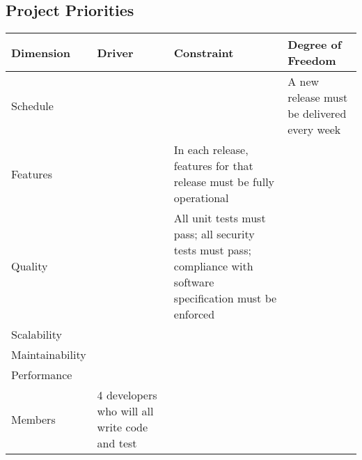 \documentclass[letter]{scrartcl}
\begin{document}
\subsection{Project Priorities}
\begin{tabularx}{\textwidth}{| X | X | X | X |}
\hline
\textbf{Dimension} & \textbf{Driver} & \textbf{Constraint} & \textbf{Degree of Freedom} \\
\hline
\hline
Schedule & & & A new release must be delivered every week \\
\hline
Features & & In each release, features for that release must be fully operational & \\
\hline
Quality  & & All unit tests must pass; all security tests must pass; compliance with software specification must be enforced & \\
\hline
Scalability & & & \\
\hline
Maintainability & & & \\
\hline
Performance & & & \\
\hline
Members  & 4 developers who will all write code and test & & \\
\hline
\end{tabularx}
\end{document}
